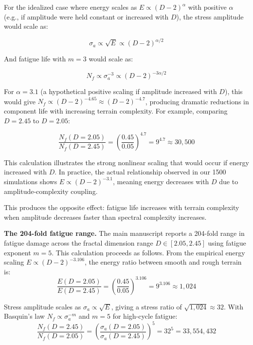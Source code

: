 \documentclass[11pt]{article}
\begin{document}
For the idealized case where energy scales as $E \propto (D-2)^\alpha$ with positive $\alpha$ (e.g., if amplitude were held constant or increased with $D$), the stress amplitude would scale as:

\begin{equation}
\sigma_a \propto \sqrt{E} \propto (D-2)^{\alpha/2}
\end{equation}

And fatigue life with $m = 3$ would scale as:

\begin{equation}
N_f \propto \sigma_a^{-3} \propto (D-2)^{-3\alpha/2}
\end{equation}

For $\alpha = 3.1$ (a hypothetical positive scaling if amplitude increased with $D$), this would give $N_f \propto (D-2)^{-4.65} \approx (D-2)^{-4.7}$, producing dramatic reductions in component life with increasing terrain complexity. For example, comparing $D = 2.45$ to $D = 2.05$:

\begin{equation}
\frac{N_f(D=2.05)}{N_f(D=2.45)} = \left(\frac{0.45}{0.05}\right)^{4.7} = 9^{4.7} \approx 30{,}500
\end{equation}

This calculation illustrates the strong nonlinear scaling that would occur if energy increased with $D$. In practice, the actual relationship observed in our 1500 simulations shows $E \propto (D-2)^{-3.1}$, meaning energy decreases with $D$ due to amplitude-complexity coupling. 

This produces the opposite effect: fatigue life increases with terrain complexity when amplitude decreases faster than spectral complexity increases.

\textbf{The 204-fold fatigue range.} The main manuscript reports a 204-fold range in fatigue damage across the fractal dimension range $D \in [2.05, 2.45]$ using fatigue exponent $m = 5$. This calculation proceeds as follows. From the empirical energy scaling $E \propto (D-2)^{-3.106}$, the energy ratio between smooth and rough terrain is:
\begin{equation}
\frac{E(D=2.05)}{E(D=2.45)} = \left(\frac{0.45}{0.05}\right)^{3.106} = 9^{3.106} \approx 1{,}024
\end{equation}

Stress amplitude scales as $\sigma_a \propto \sqrt{E}$, giving a stress ratio of $\sqrt{1{,}024} \approx 32$. With Basquin's law $N_f \propto \sigma_a^{-m}$ and $m = 5$ for high-cycle fatigue:
\begin{equation}
\frac{N_f(D=2.45)}{N_f(D=2.05)} = \left(\frac{\sigma_a(D=2.05)}{\sigma_a(D=2.45)}\right)^5 = 32^5 = 33{,}554{,}432
\end{equation}
\end{document}

